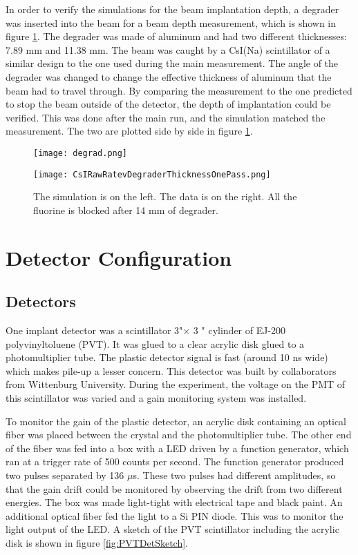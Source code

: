 \documentclass[../MaxHughesThesis.tex]{subfiles}
\begin{document}
In order to verify the simulations for the beam implantation depth, a degrader was inserted into the beam for a beam depth measurement, which is shown in figure \ref{fig:degraderdata}.
The degrader was made of aluminum and had two different thicknesses: 7.89 mm and 11.38 mm. 
The beam was caught by a CsI(Na) scintillator of a similar design to the one used during the main measurement.
The angle of the degrader was changed to change the effective thickness of aluminum that the beam had to travel through. 
By comparing the measurement to the one predicted to stop the beam outside of the detector, the depth of implantation could be verified. 
This was done after the main run, and the simulation matched the measurement.
The two are plotted side by side in figure \ref{fig:degraderdata}.

\begin{figure}
    \centering
    \begin{minipage}{0.50\textwidth}
	\centerline{\texttt{[image: degrad.png]}}
    \end{minipage}\hfill
    \begin{minipage}{0.50\textwidth}
	\centerline{\texttt{[image: CsIRawRatevDegraderThicknessOnePass.png]}}
    \end{minipage}
	\caption{The simulation is on the left.
		 The data is on the right.
		 All the fluorine is blocked after 14 mm of degrader.}
	\label{fig:degraderdata}
\end{figure}


\section{Detector Configuration}

\subsection{Detectors}
One implant detector was a scintillator 3"\diameter $\times$  3 " cylinder of EJ-200 polyvinyltoluene (PVT).
It was glued to a clear acrylic disk glued to a photomultiplier tube.
The plastic detector signal is fast (around 10 ns wide) which makes pile-up a lesser concern.
This detector was built by collaborators from Wittenburg University.
During the experiment, the voltage on the PMT of this scintillator was varied and a gain monitoring system was installed.

To monitor the gain of the plastic detector, an acrylic disk containing an optical fiber was placed between the crystal and the photomultiplier tube. 
The other end of the fiber was fed into a box with a LED driven by a function generator, which ran at a trigger rate of 500 counts per second. 
The function generator produced two pulses separated by 136 $\mu$s.
These two pulses had different amplitudes, so that the gain drift could be monitored by observing the drift from two different energies.
The box was made light-tight with electrical tape and black paint.
An additional optical fiber fed the light to a Si PIN diode.
This was to monitor the light output of the LED.
A sketch of the PVT scintillator including the acrylic disk is shown in figure \ref{fig:PVTDetSketch}.
\end{document}

